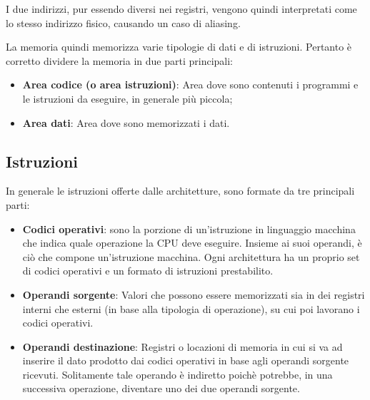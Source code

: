 I due indirizzi, pur essendo diversi nei registri, vengono quindi interpretati come lo stesso indirizzo 
fisico, causando un caso di aliasing.

\vspace{1em}
La memoria quindi memorizza varie tipologie di dati e di istruzioni. Pertanto è corretto dividere la memoria in due parti principali:

\begin{itemize}
    \item \textbf{Area codice (o area istruzioni)}: Area dove sono contenuti i programmi e le istruzioni da eseguire, in generale più piccola;
    \item \textbf{Area dati}: Area dove sono memorizzati i dati.
\end{itemize}

\subsection{Istruzioni}\label{par:istruzioni}
In generale le istruzioni offerte dalle architetture, sono formate da tre principali parti:
\begin{itemize}
    \item \textbf{Codici operativi}: sono la porzione di un'istruzione in linguaggio macchina che indica quale operazione la CPU deve eseguire. Insieme ai suoi operandi, è ciò che compone un'istruzione macchina. Ogni architettura ha un proprio set di codici operativi e un formato di istruzioni prestabilito.

    \item \textbf{Operandi sorgente}: Valori che possono essere memorizzati sia in dei registri interni che esterni (in base alla tipologia di operazione), su cui poi lavorano i codici operativi.

    \item \textbf{Operandi destinazione}: Registri o locazioni di memoria in cui si va ad inserire il dato prodotto dai codici operativi in base agli operandi sorgente ricevuti. Solitamente tale operando è indiretto poichè potrebbe, in una successiva operazione, diventare uno dei due operandi sorgente.
\end{itemize}

